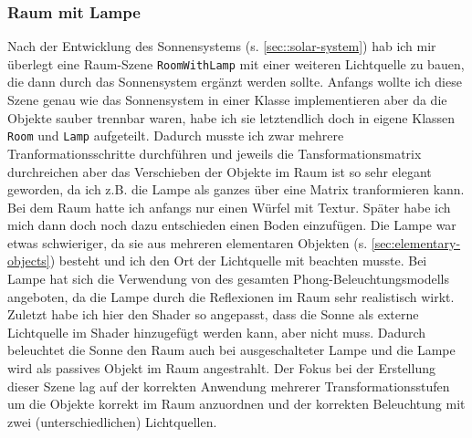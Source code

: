 \documentclass{article}
\let\oldsubsubsection\subsubsection
\renewcommand\subsubsection{\needspace{5\baselineskip}\oldsubsubsection}
\begin{document}
\subsubsection{Raum mit Lampe}
Nach der Entwicklung des Sonnensystems (s. \ref{sec::solar-system}) hab ich mir überlegt eine Raum-Szene \texttt{RoomWithLamp} mit einer weiteren Lichtquelle zu bauen, die dann durch das Sonnensystem ergänzt werden sollte.
Anfangs wollte ich diese Szene genau wie das Sonnensystem in einer Klasse implementieren aber da die Objekte sauber trennbar waren, habe ich sie letztendlich doch in eigene Klassen \texttt{Room} und \texttt{Lamp} aufgeteilt.
Dadurch musste ich zwar mehrere Tranformationsschritte durchführen und jeweils die Tansformationsmatrix durchreichen aber das Verschieben der Objekte im Raum ist so sehr elegant geworden, da ich z.B. die Lampe als ganzes über eine Matrix tranformieren kann.
Bei dem Raum hatte ich anfangs nur einen Würfel mit Textur. Später habe ich mich dann doch noch dazu entschieden einen Boden einzufügen.
Die Lampe war etwas schwieriger, da sie aus mehreren elementaren Objekten (s. \ref{sec:elementary-objects}) besteht und ich den Ort der Lichtquelle mit beachten musste.
Bei Lampe hat sich die Verwendung von des gesamten Phong-Beleuchtungsmodells angeboten, da die Lampe durch die Reflexionen im Raum sehr realistisch wirkt.
Zuletzt habe ich hier den Shader so angepasst, dass die Sonne als externe Lichtquelle im Shader hinzugefügt werden kann, aber nicht muss.
Dadurch beleuchtet die Sonne den Raum auch bei ausgeschalteter Lampe und die Lampe wird als passives Objekt im Raum angestrahlt.
Der Fokus bei der Erstellung dieser Szene lag auf der korrekten Anwendung mehrerer Transformationsstufen um die Objekte korrekt im Raum anzuordnen und der korrekten Beleuchtung mit zwei (unterschiedlichen) Lichtquellen.
\end{document}
